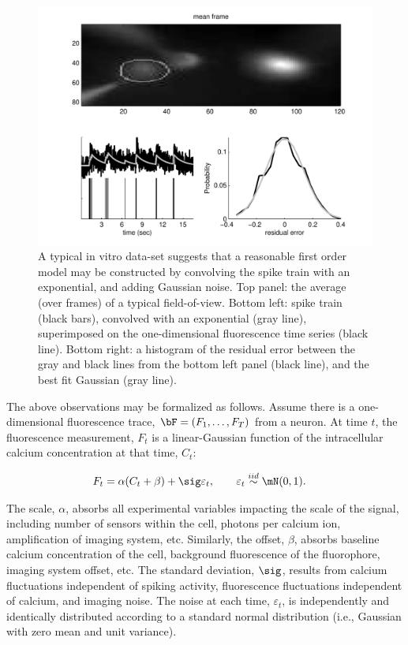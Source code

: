 \begin{figure}[h!]
\centering \includegraphics[width=.9\linewidth]{../figs/in_vitro_ex}
\caption{A typical in vitro data-set suggests that a reasonable first order model may be constructed by convolving the spike train with an exponential, and adding Gaussian noise. Top panel: the average (over frames) of a typical field-of-view.  Bottom left: spike train (black bars), convolved with an exponential (gray line), superimposed on the one-dimensional fluorescence time series (black line).  Bottom right: a histogram of the residual error between the gray and black lines from the bottom left panel (black line), and the best fit Gaussian (gray line).} \label{fig:in_vitro_ex}
\end{figure}

The above observations may be formalized as follows. Assume there is a one-dimensional fluorescence trace, $\bF=(F_1, \ldots, F_T)$ from a neuron.  At time $t$, the fluorescence measurement, $F_t$ is a linear-Gaussian function of the intracellular calcium concentration at that time, $C_t$:

\begin{align} \label{eq:F}
F_t &= \alpha (C_t + \beta) + \sig \varepsilon_t, \qquad \varepsilon_t \overset{iid}{\sim} \mN(0,1).
\end{align}

\noindent The scale, $\alpha$, absorbs all experimental variables impacting the scale of the signal, including number of sensors within the cell, photons per calcium ion, amplification of imaging system, etc.  Similarly, the offset, $\beta$, absorbs baseline calcium concentration of the cell, background fluorescence of the fluorophore, imaging system offset, etc.  The standard deviation, $\sig$, results from calcium fluctuations independent of spiking activity, fluorescence fluctuations independent of calcium, and imaging noise. The noise at each time, $\varepsilon_t$, is independently and identically distributed according to a standard normal distribution (i.e., Gaussian with zero mean and unit variance). 

